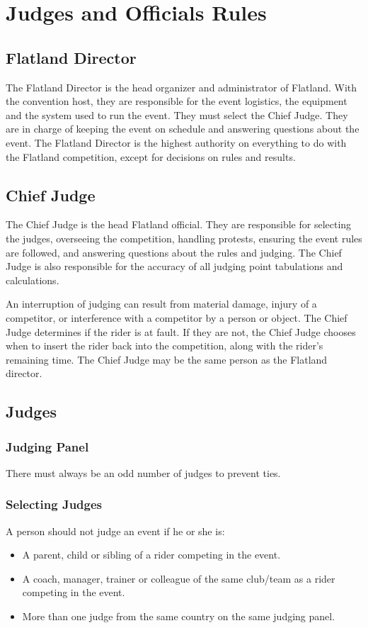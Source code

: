 \chapter{Judges and Officials Rules}

\section{Flatland Director}

The Flatland Director is the head organizer and administrator of Flatland.
With the convention host, they are responsible for the event logistics, the equipment and the system used to run the event.
They must select the Chief Judge.
They are in charge of keeping the event on schedule and answering questions about the event.
The Flatland Director is the highest authority on everything to do with the Flatland competition, except for decisions on rules and results.

\section{Chief Judge}

The Chief Judge is the head Flatland official.
They are responsible for selecting the judges, overseeing the competition, handling protests, ensuring the event rules are followed, and answering questions about the rules and judging.
The Chief Judge is also responsible for the accuracy of all judging point tabulations and calculations.

An interruption of judging can result from material damage, injury of a competitor, or interference with a competitor by a person or object.
The Chief Judge determines if the rider is at fault.
If they are not, the Chief Judge chooses when to insert the rider back into the competition, along with the rider's remaining time.
The Chief Judge may be the same person as the Flatland director.

\section{Judges}

\subsection{Judging Panel}

There must always be an odd number of judges to prevent ties.

\subsection{Selecting Judges}
A person should not judge an event if he or she is:
\begin{itemize}
\item A parent, child or sibling of a rider competing in the event.
\item A coach, manager, trainer or colleague of the same club/team as a rider competing in the event.
\item More than one judge from the same country on the same judging panel.
\end{itemize}

